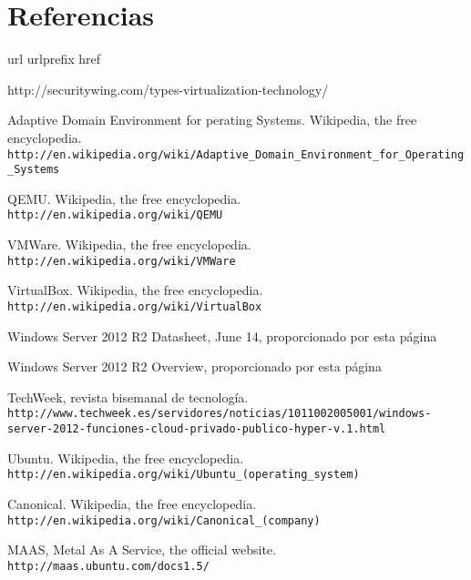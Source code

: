 \documentclass[paper=a4, fontsize=11pt]{scrartcl} %
\numberwithin{equation}{section} %
\numberwithin{figure}{section} %
\numberwithin{table}{section} %
\begin{document}
\section{Referencias}
\begin{thebibliography}{10}
\expandafter\ifx\csname url\endcsname\relax
  \def\url#1{\texttt{#1}}\fi
\expandafter\ifx\csname urlprefix\endcsname\relax\def\urlprefix{URL }\fi
\expandafter\ifx\csname href\endcsname\relax
  \def\href#1#2{#2} \def\path#1{#1}\fi

http://securitywing.com/types-virtualization-technology/

Adaptive Domain Environment for perating Systems. Wikipedia, the free encyclopedia.\\
  \url{http://en.wikipedia.org/wiki/Adaptive_Domain_Environment_for_Operating_Systems}

QEMU. Wikipedia, the free encyclopedia.\\
  \url{http://en.wikipedia.org/wiki/QEMU}

VMWare. Wikipedia, the free encyclopedia.\\
  \url{http://en.wikipedia.org/wiki/VMWare}

VirtualBox. Wikipedia, the free encyclopedia.\\
  \url{http://en.wikipedia.org/wiki/VirtualBox}

Windows Server 2012 R2 Datasheet, June 14, proporcionado por
\href{http://www.microsoft.com/es-es/server-cloud/products/windows-server-2012-r2/}{esta página}

Windows Server 2012 R2 Overview, proporcionado por
\href{http://www.microsoft.com/es-es/server-cloud/products/windows-server-2012-r2/}{esta página}

TechWeek, revista bisemanal de tecnología.\\
  \url{http://www.techweek.es/servidores/noticias/1011002005001/windows-server-2012-funciones-cloud-privado-publico-hyper-v.1.html}

Ubuntu. Wikipedia, the free encyclopedia.\\
  \url{http://en.wikipedia.org/wiki/Ubuntu_(operating_system)}

Canonical. Wikipedia, the free encyclopedia.\\
  \url{http://en.wikipedia.org/wiki/Canonical_(company)}

MAAS, Metal As A Service, the official website.\\
  \url{http://maas.ubuntu.com/docs1.5/}


\end{thebibliography}
\end{document}
